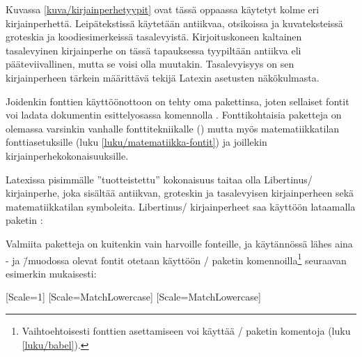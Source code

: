 \noindent
Kuvassa \ref{kuva/kirjainperhetyypit} ovat tässä oppaassa käytetyt kolme
eri kirjainperhettä. Leipätekstissä käytetään antiikvaa, otsikoissa ja
kuvateksteissä groteskia ja koodiesimerkeissä tasalevyistä.
Kirjoituskoneen kaltainen tasalevyinen kirjainperhe on tässä tapauksessa
tyypiltään antiikva eli pääteviivallinen, mutta se voisi olla muutakin.
Tasalevyisyys on sen kirjainperheen tärkein määrittävä tekijä Latexin
asetusten näkökulmasta.


Joidenkin fonttien käyttöönottoon on tehty oma pakettinsa, joten
sellaiset fontit voi ladata dokumentin esittelyosassa komennolla
. Fonttikohtaisia paketteja on olemassa
varsinkin vanhalle fonttitekniikalle () mutta myös matematiikkatilan fonttiasetuksille (luku
\ref{luku/matematiikka-fontit}) ja joillekin
kir\-jain\-perhe\-koko\-nai\-suuk\-sille.

Latexissa pisimmälle ''tuotteistettu'' kokonaisuus taitaa olla
Libertinus\-/ kirjainperhe, joka sisältää antiikvan, groteskin ja
tasalevyisen kirjainperheen sekä matematiikkatilan symboleita.
Libertinus\-/ kirjainperheet saa käyttöön lataamalla paketin
:

\begin{koodilohkosis}
\usepackage{libertinus}
\end{koodilohkosis}

\noindent
Valmiita paketteja on kuitenkin vain harvoille fonteille, ja käytännössä
lähes aina - ja  \=/muodossa
olevat fontit otetaan käyttöön \-/ paketin
komennoilla\footnote{Vaihtoehtoisesti fonttien asettamiseen voi käyttää
  \-/ paketin komentoja (luku \ref{luku/babel}).}
seuraavan esimerkin mukaisesti:

\begin{koodilohkosis}
\setmainfont{TeX Gyre Termes}[Scale=1]
\setsansfont{TeX Gyre Heros} [Scale=MatchLowercase]
\setmonofont{TeX Gyre Cursor}[Scale=MatchLowercase]
\end{koodilohkosis}

